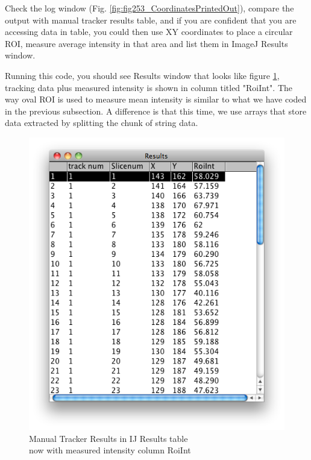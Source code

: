 \documentclass[11pt,a4paper,oneside]{report}
\begin{document}
Check the log window (Fig. \ref{fig:fig253_CoordinatesPrintedOut}), 
compare the output with manual tracker results table, and if you are confident that you are accessing data in table, 
you could then use XY coordinates to place a circular ROI, 
measure average intensity in that area and list them in ImageJ Results window.



Running this code, you should see Results window that looks like figure 
\ref{fig:fig262_ManualTrackIntfinalResults}, tracking data plus measured intensity is shown in 
column titled "RoiInt". The way oval ROI is used to measure mean intensity is similar to what 
we have coded in the previous subsection. A difference is that this time, we use arrays that store data 
extracted by splitting the chunk of string data. 

\begin{figure}[htbp]
\begin{center}
\includegraphics[scale=0.5]{fig/fig262_ManualTrackIntensityFinalResults.png}
\caption{ Manual Tracker Results in IJ Results table\\ now with measured intensity column RoiInt}
\label{fig:fig262_ManualTrackIntfinalResults}
\end{center}
\end{figure}
\end{document}
